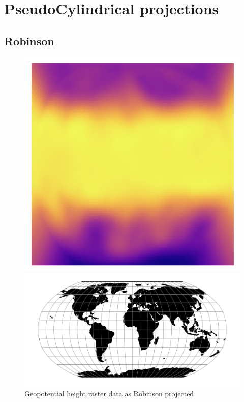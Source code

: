 \newpage

\section{PseudoCylindrical projections}
\subsection{Robinson}
\begin{figure}[H]
    \centering
    \begin{minipage}{0.30\textwidth}
        \centering
        \includegraphics[width=0.9\linewidth]{figures/chapter-8/geopoth_robin.png}
        \caption{ Geopotential height raster data as Robinson projected}
        \label{fig:robin_geopoth_raster}
    \end{minipage}\hfill
    \begin{minipage}{0.30\textwidth}
        \centering
        \includegraphics[width=0.9\linewidth]{figures/chapter-8/robin.png}

\end{minipage}
\end{figure}
